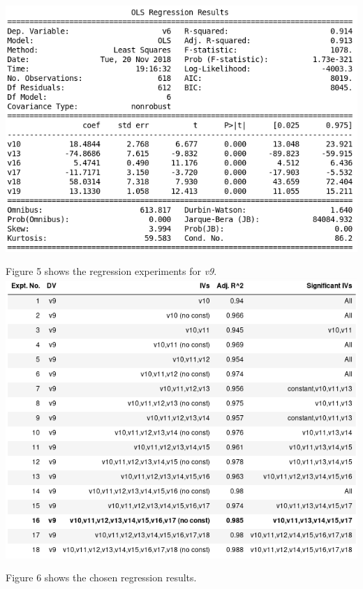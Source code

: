 \documentclass[12pt,a4paper]{article}
\begin{document}
\includegraphics[scale=0.5]{v6_exp.png}
\begingroup
{}
\endgroup

Figure 5 shows the regression experiments for \textit{v9}.\\

\includegraphics[scale=0.5]{v9_reg.png}
\begingroup
{}
\endgroup

Figure 6 shows the chosen regression results.\\
\end{document}
